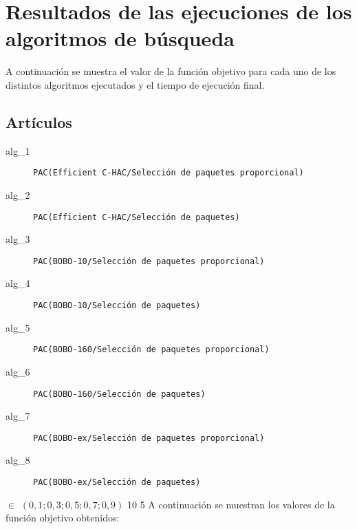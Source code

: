 \section{Resultados de las ejecuciones de los algoritmos de búsqueda}
A continuación se muestra el valor de la función objetivo para cada uno de los distintos algoritmos ejecutados y el tiempo de ejecución final.
\subsection{Artículos}
\Solucion {}
{
\begin{description}
	\item[alg\_1] \texttt{PAC(Efficient C-HAC/Selección de paquetes proporcional)}
	\item[alg\_2] \texttt{PAC(Efficient C-HAC/Selección de paquetes)}
	\item[alg\_3] \texttt{PAC(BOBO-10/Selección de paquetes proporcional)}
	\item[alg\_4] \texttt{PAC(BOBO-10/Selección de paquetes)}
	\item[alg\_5] \texttt{PAC(BOBO-160/Selección de paquetes proporcional)}
	\item[alg\_6] \texttt{PAC(BOBO-160/Selección de paquetes)}
	\item[alg\_7] \texttt{PAC(BOBO-ex/Selección de paquetes proporcional)}
	\item[alg\_8] \texttt{PAC(BOBO-ex/Selección de paquetes)}
\end{description}
}
{$\in$ $(0,1; 0,3; 0,5; 0,7; 0,9)$}
{10}
{5}
A continuación se muestran los valores de la función objetivo obtenidos:\\
